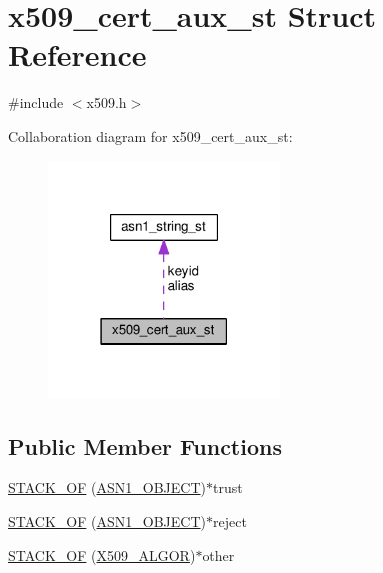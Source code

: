 \hypertarget{structx509__cert__aux__st}{}\section{x509\+\_\+cert\+\_\+aux\+\_\+st Struct Reference}
\label{structx509__cert__aux__st}


{\ttfamily \#include $<$x509.\+h$>$}



Collaboration diagram for x509\+\_\+cert\+\_\+aux\+\_\+st\+:
\nopagebreak
\begin{figure}[H]
\begin{center}
\leavevmode
\includegraphics[width=174pt]{structx509__cert__aux__st__coll__graph}
\end{center}
\end{figure}
\subsection*{Public Member Functions}
\begin{DoxyCompactItemize}
\item 
\hyperlink{structx509__cert__aux__st_ad4b8077f431c0da89bdbd1978f789ddd}{S\+T\+A\+C\+K\+\_\+\+OF} (\hyperlink{asn1_8h_ae10c08e4e6b23f67a39b2add932ec48f}{A\+S\+N1\+\_\+\+O\+B\+J\+E\+CT})$\ast$trust
\item 
\hyperlink{structx509__cert__aux__st_a0ee0ce86f6686d7c209016b00dec98cb}{S\+T\+A\+C\+K\+\_\+\+OF} (\hyperlink{asn1_8h_ae10c08e4e6b23f67a39b2add932ec48f}{A\+S\+N1\+\_\+\+O\+B\+J\+E\+CT})$\ast$reject
\item 
\hyperlink{structx509__cert__aux__st_a5bb857958015dab429b264c21db5b980}{S\+T\+A\+C\+K\+\_\+\+OF} (\hyperlink{ossl__typ_8h_aa2b6185e6254f36f709cd6577fb5022e}{X509\+\_\+\+A\+L\+G\+OR})$\ast$other
\end{DoxyCompactItemize}
